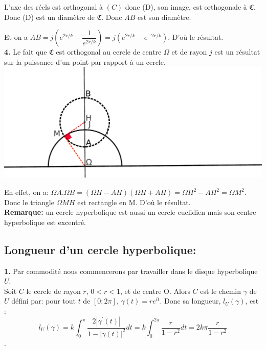 \documentclass[a4paper, 12pt, twoside]{book}
\begin{document}
   L'axe des réels est orthogonal à $(C)$ donc (D), son image, est orthogonale à $\mathfrak{C}$. Donc (D) est un diamètre de $\mathfrak{C}$. Donc $AB$ est son diamètre.\
   
   Et on a $AB=j(e^{2r/k}-\dfrac{1}{e^{2r/k}})=j(e^{2r/k}-e^{-2r/k})$. D'où le résultat. \\
   
    \textbf{4.} Le fait que $\mathfrak{C}$ est orthogonal au cercle de centre $\Omega$ et de rayon $j$ est un résultat sur la puissance d'un point par rapport à un cercle.\\
   
   
 \includegraphics[scale=0.2]{figures/hyper7.eps} 
 
 En effet, on a: $\Omega A.\Omega B=(\Omega H-AH)(\Omega H+AH)=\Omega H^{2}-AH^{2}=\Omega M^{2}$. Donc le triangle $\Omega MH$ est rectangle en M. D'où le résultat.\\ 
    
 \textbf{Remarque:} un cercle hyperbolique est aussi un cercle euclidien mais son centre hyperbolique est excentré.\\
 
 \subsection{Longueur d'un cercle hyperbolique:}
 
\textbf{1.} Par commodité nous commencerons par travailler dans le disque hyperbolique $U$.\\
 
 Soit $C$ le cercle de rayon $r$, $0<r<1$, et de centre O. Alors $C$ est le chemin $\gamma$ de $U$ défini par: pour tout $t$ de $[0; 2\pi]$, $\gamma(t)=re^{it}$. Donc sa longueur, $l_{U}(\gamma)$, est :
  $$l_{U}(\gamma)=k\int_{0}^{\pi} \dfrac{2|\gamma^{'}(t)|}{1-|\gamma(t)|^{2}} dt=k\int_{0}^{2\pi} \dfrac{r}{1-r^{2}} dt=2k\pi \dfrac{r}{1-r^{2}}$$.\\
  
\end{document}
